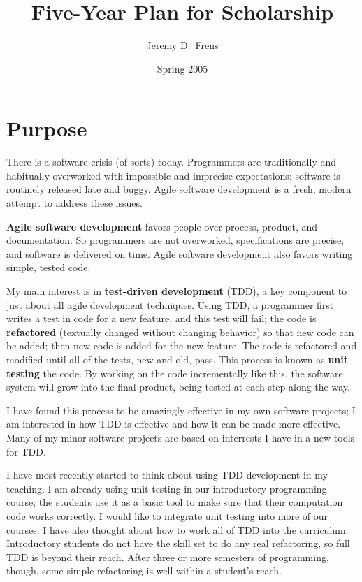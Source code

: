 \documentclass{article}
\title{Five-Year Plan for Scholarship}
\author{Jeremy D.\ Frens}
\date{Spring 2005}
\newcommand{\term}[1]{\textbf{#1}}
\begin{document}
\maketitle

\section*{Purpose}

There is a software crisis (of sorts) today.  Programmers are traditionally and habitually overworked with impossible and imprecise expectations; software is routinely released late and buggy.  Agile software development is a fresh, modern attempt to address these issues.

\term{Agile software development} favors people over process, product, and documentation.  So programmers are not overworked, specifications are precise, and software is delivered on time.  Agile software development also favors writing simple, tested code.

My main interest is in \term{test-driven development} (TDD), a key component to just about all agile development techniques.  Using TDD, a programmer first writes a test in code for a new feature, and this test will fail; the code is \term{refactored} (textually changed without changing behavior) so that new code can be added; then new code is added for the new feature.  The code is refactored and modified until all of the tests, new and old, pass.  This process is known as \term{unit testing} the code.  By working on the code incrementally like this, the software system will grow into the final product, being tested at each step along the way.

I have found this process to be amazingly effective in my own software projects; I am interested in how TDD is effective and how it can be made more effective.  Many of my minor software projects are based on interrests I have in a new tools for TDD.

I have most recently started to think about using TDD development in my teaching.  I am already using unit testing in our introductory programming course; the students use it as a basic tool to make sure that their computation code works correctly.  I would like to integrate unit testing into more of our courses.  I have also thought about how to work all of TDD into the curriculum.  Introductory students do not have the skill set to do any real refactoring, so full TDD is beyond their reach.  After three or more semesters of programming, though, some simple refactoring is well within a student's reach.
\end{document}
